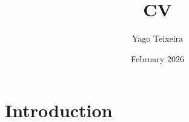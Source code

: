 \documentclass{article}
\title{CV}
\author{Yago Teixeira}
\date{February 2026}
\begin{document}
\maketitle

\section{Introduction}
\end{document}

